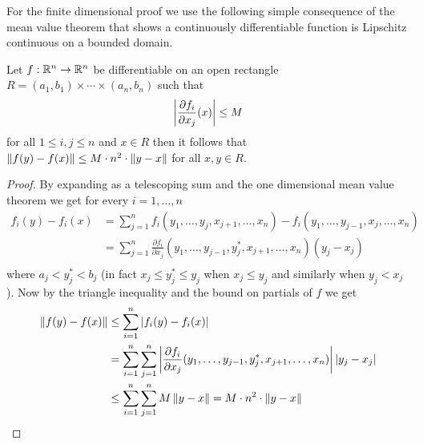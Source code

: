 For the finite dimensional proof we use the following simple
consequence of the mean value theorem
that shows a continuously differentiable function is Lipschitz
continuous on a bounded domain.
\begin{lem}\label{IFT:BoundedDerivativeImpliesLipschitz}Let $f : \mathbb{R}^n \to \mathbb{R}^n$ be differentiable on an
  open rectangle $R = (a_1,b_1) \times \dotsm \times (a_n, b_n)$ such that 
\begin{align*}
\left \vert \frac{\partial f_i}{\partial x_j}(x) \right \vert \leq M
\end{align*}
for all $1 \leq i,j \leq n$ and $x \in R$ then it follows that
$\left \lVert f(y)-f(x) \right \rVert \leq M \cdot n^2 \cdot \left \lVert y-x \right \rVert$ for all $x,y \in R$.
\end{lem}
\begin{proof}
By expanding as a telescoping sum and the one
dimensional mean value theorem we
get for every $i=1, \dotsc, n$ 
\begin{align*}
f_i(y) - f_i(x) &= \sum_{j=1}^n f_i(y_1, \dotsc, y_j, x_{j+1},
                     \dotsc, x_n) - 
f_i(y_1, \dotsc, y_{j-1}, x_{j},
                     \dotsc, x_n)\\
&= \sum_{j=1}^n \frac{\partial f_i}{\partial x_j} (y_1, \dotsc, y_{j-1}, y^*_j, x_{j+1},
                     \dotsc, x_n) (y_j - x_j)\\
\end{align*}
where $a_j < y^*_j  < b_j$ (in fact $x_j \leq y^*_j \leq y_j$ when
$x_j \leq y_j$ and similarly when $y_j < x_j$).  Now by the triangle
inequality and the bound on partials of $f$ we get
\begin{align*}
\left \lVert f(y) - f(x) \right \rVert &\leq \sum_{i=1}^n \left \vert f_i(y) - f_i(x) \right \vert \\
&= \sum_{i=1}^n \sum_{j=1}^n \left \vert \frac{\partial f_i}{\partial x_j} (y_1, \dotsc, y_{j-1}, y^*_j, x_{j+1},
                     \dotsc, x_n) \right \vert \left \vert  y_j - x_j  \right \vert \\
&\leq \sum_{i=1}^n \sum_{j=1}^n M \left \lVert y - x \right \rVert = M \cdot n^2 \cdot
  \left \lVert y -x \right \rVert
\end{align*}
\end{proof}


